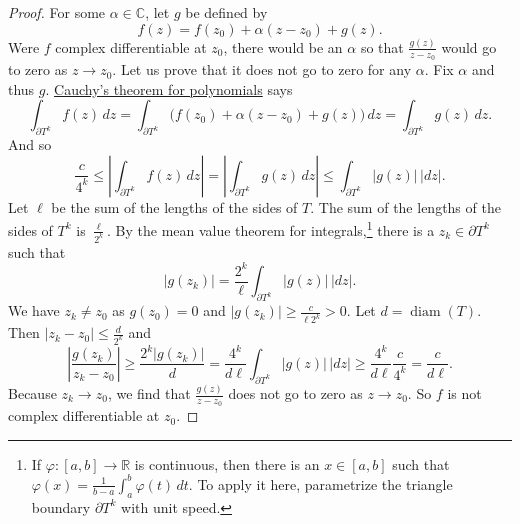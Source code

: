 \documentclass[12pt,openany]{book}
\newcommand{\sabs}[1]{\lvert {#1} \rvert}
\newcommand{\abs}[1]{\left\lvert {#1} \right\rvert}
\newcommand{\C}{{\mathbb{C}}}
\newcommand{\R}{{\mathbb{R}}}
\theoremstyle{plain}
\theoremstyle{remark}
\theoremstyle{definition}
\theoremstyle{exercise}
\theoremstyle{example}
\begin{document}
\begin{proof}
For some $\alpha \in \C$, let $g$ be defined by
\begin{equation*}
f(z) = f(z_0) + \alpha (z-z_0) + g(z) .
\end{equation*}
Were $f$ complex differentiable at $z_0$, there would be an $\alpha$ so that
$\frac{g(z)}{z-z_0}$ would go to zero as $z \to z_0$.
Let us prove that it does not go to zero for any $\alpha$.  Fix $\alpha$
and thus $g$.
\hyperref[cor:cauchyforpoly]{Cauchy's theorem for polynomials} says
\begin{equation*}
\int_{\partial T^k} f(z) \, dz =
\int_{\partial T^k} \bigl( f(z_0) + \alpha (z-z_0) + g(z) \bigr) \, dz =
\int_{\partial T^k} g(z) \, dz .
\end{equation*}
And so
\begin{equation*}
\frac{c}{4^k} \leq
\abs{
\int_{\partial T^k} f(z) \, dz
} =
\abs{
\int_{\partial T^k} g(z) \, dz 
}
\leq
\int_{\partial T^k} \sabs{g(z)} \, \sabs{dz} .
\end{equation*}
Let $\ell$ be the sum of the lengths of the sides of $T$.
The sum of the lengths of the sides of $T^k$ is
$\frac{\ell}{2^k}$.
By the mean value theorem for integrals,\footnote{%
If $\varphi \colon [a,b] \to \R$ is continuous, then there is an $x \in [a,b]$
such that $\varphi(x) = \frac{1}{b-a} \int_a^b \varphi(t) \, dt$.
To apply it here, parametrize the triangle boundary $\partial T^k$ with unit speed.}
there is a $z_k \in \partial T^k$ such that
\begin{equation*}
\sabs{g(z_k)} = 
\frac{2^k}{\ell}
\int_{\partial T^k} \sabs{g(z)} \, \sabs{dz} .
\end{equation*}
We have $z_k \neq z_0$ as $g(z_0)=0$
and $\sabs{g(z_k)} \geq \frac{c}{\ell 2^k} > 0$.
Let $d = \operatorname{diam}(T)$.  Then
$\sabs{z_k-z_0} \leq \frac{d}{2^k}$ and
\begin{equation*}
\abs{\frac{g(z_k)}{z_k-z_0}}
\geq
\frac{2^k\sabs{g(z_k)}}{d}
=
\frac{4^k}{d \ell}
\int_{\partial T^k} \sabs{g(z)} \, \sabs{dz}
\geq
\frac{4^k}{d \ell}
\frac{c}{4^k} = \frac{c}{d \ell} .
\end{equation*}
Because $z_k \to z_0$, we find that $\frac{g(z)}{z-z_0}$ does not 
go to zero as $z \to z_0$.  So $f$ is not complex differentiable at $z_0$.
\end{proof}
\end{document}
